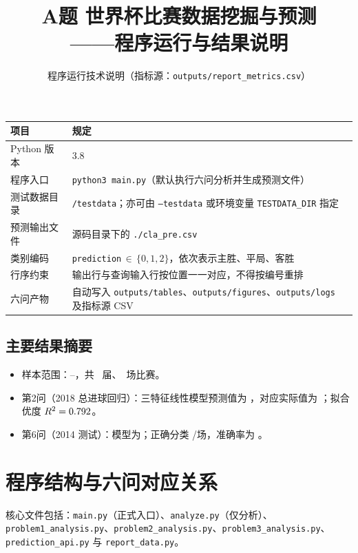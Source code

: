 \documentclass[UTF8,a4paper,zihao=-4]{ctexart}
\title{\vspace{-1.2em}\bfseries\textcolor{MainBlue}{A题 世界杯比赛数据挖掘与预测\\——程序运行与结果说明}}
\author{程序运行技术说明（指标源：\texttt{outputs/report\_metrics.csv}）}
\date{}
\begin{document}
\maketitle
\vspace{-1.2em}

\begin{tcolorbox}[title=运行与提交协议]
\begin{tabularx}{\textwidth}{@{}lX@{}}
\toprule
\textbf{项目} & \textbf{规定} \\
\midrule
Python 版本 & 3.8 \\
程序入口 & \texttt{python3 main.py}（默认执行六问分析并生成预测文件） \\
测试数据目录 & \texttt{/testdata}；亦可由 \texttt{--testdata} 或环境变量 \texttt{TESTDATA\_DIR} 指定 \\
预测输出文件 & 源码目录下的 \texttt{./cla\_pre.csv} \\
类别编码 & \texttt{prediction}$\,\in\,\{0,1,2\}$，依次表示主胜、平局、客胜 \\
行序约束 & 输出行与查询输入行按位置一一对应，不得按编号重排 \\
六问产物 & 自动写入 \texttt{outputs/tables}、\texttt{outputs/figures}、\texttt{outputs/logs} 及指标源 CSV \\
\bottomrule
\end{tabularx}
\end{tcolorbox}

\subsection*{主要结果摘要}
\begin{itemize}
  \item 样本范围：\MetricDataMinYear--\MetricDataMaxYear，共 \MetricTournamentCount\ 届、\MetricMatchCount\ 场比赛。
  \item 第2问（2018 总进球回归）：三特征线性模型预测值为 \MetricPOnePredTwentyEighteen，对应实际值为 \MetricPOneActualTwentyEighteen；拟合优度 $R^2=0.792$。
  \item 第6问（2014 测试）：模型为\MetricPThreeModel；正确分类 \MetricPThreeCorrect/\MetricPThreeN 场，准确率为 \MetricPThreeAcc。
\end{itemize}

\section{程序结构与六问对应关系}
核心文件包括：\texttt{main.py}（正式入口）、\texttt{analyze.py}（仅分析）、\texttt{problem1\_analysis.py}、\texttt{problem2\_analysis.py}、\texttt{problem3\_analysis.py}、\texttt{prediction\_api.py} 与 \texttt{report\_data.py}。
\end{document}
